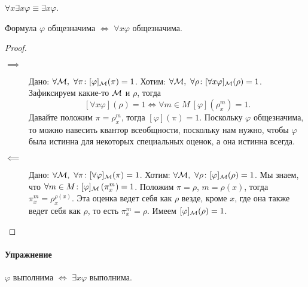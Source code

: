 \begin{corollary}
    $\forall x \exists x \varphi \equiv \exists x \varphi$.
\end{corollary}

\begin{statement}
    Формула $\varphi$ общезначима $\iff$ $\forall x \varphi$ общезначима.
\end{statement}

\begin{proof}~
    \begin{description}
        \item[$\implies$] Дано: $\forall \mathcal{M},~\forall \pi \colon [\varphi]_{\mathcal{M}}(\pi) = 1$.
        Хотим: $\forall \mathcal{M},~\forall \rho \colon [\forall x \varphi]_{\mathcal{M}}(\rho) = 1$.
        Зафиксируем какие-то $\mathcal{M}$ и $\rho$, тогда
        $$
            [\forall x \varphi](\rho) = 1 \iff \forall m \in M~ [\varphi]\left(\rho_{x}^{m}\right) = 1.
        $$
        Давайте положим $\pi = \rho_{x}^{m}$, тогда $[\varphi](\pi) = 1$.
        Поскольку $\varphi$ общезначима, то можно навесить квантор всеобщности, поскольку нам нужно, чтобы $\varphi$ была истинна для некоторых специальных оценок, а она истинна всегда.
        \item[$\impliedby$] Дано: $\forall \mathcal{M},~\forall \pi \colon [\forall\varphi]_{\mathcal{M}}(\pi) = 1$.
        Хотим: $\forall \mathcal{M},~\forall \rho \colon [\varphi]_{\mathcal{M}}(\rho) = 1$.
        Мы знаем, что $\forall m \in M \colon [\varphi]_{\mathcal{M}}\left(\pi_{x}^{m}\right) = 1$.
        Положим $\pi = \rho$, $m = \rho(x)$, тогда $\pi_{x}^{m} = \rho_{x}^{\rho(x)}$.
        Эта оценка ведет себя как $\rho$ везде, кроме $x$, где она также ведет себя как $\rho$, то есть $\pi_{x}^{m} = \rho$.
        Имеем $[\varphi]_{\mathcal{M}}(\rho) = 1$. \qedhere
    \end{description}
\end{proof}

\paragraph{Упражнение}
$\varphi$ выполнима $\iff$ $\exists x \varphi$ выполнима.

